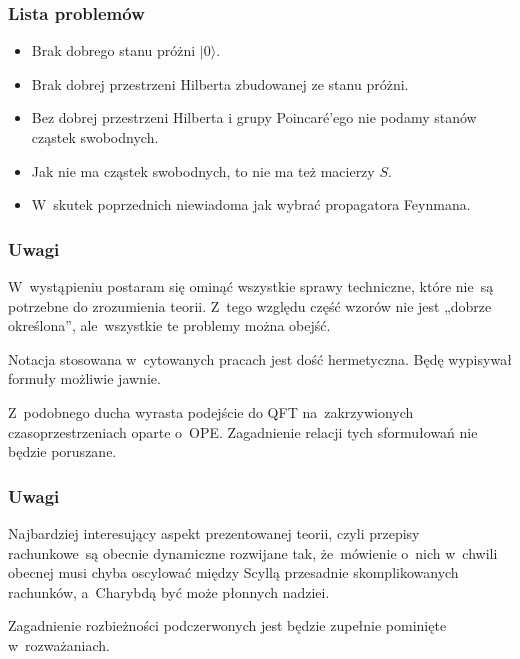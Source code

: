 \documentclass[10pt,t]{beamer}
\begin{document}
\begin{frame}
  \frametitle{Lista problemów}


  \begin{itemize}
    \RaggedRight

  \item Brak dobrego stanu próżni $| 0 \rangle$.

  \item Brak dobrej przestrzeni Hilberta zbudowanej ze stanu próżni.

  \item Bez dobrej przestrzeni Hilberta i grupy Poincar\'{e}’ego nie
    podamy stanów cząstek swobodnych.

  \item Jak nie ma cząstek swobodnych, to nie ma też macierzy $S$.

  \item W~skutek poprzednich niewiadoma jak wybrać propagatora
    Feynmana.

  \end{itemize}

\end{frame}





\begin{frame}
  \frametitle{Uwagi}


  W~wystąpieniu postaram się ominąć wszystkie sprawy techniczne,
  które nie~są potrzebne do zrozumienia teorii. Z~tego względu część
  wzorów nie jest „dobrze określona”, ale~wszystkie te problemy
  można obejść.

  Notacja stosowana w~cytowanych pracach jest dość hermetyczna. Będę
  wypisywał formuły możliwie jawnie.

  Z~podobnego ducha wyrasta podejście do QFT na~zakrzywionych
  czasoprzestrzeniach oparte o~OPE. Zagadnienie relacji
  tych sformułowań nie będzie poruszane.

\end{frame}





\begin{frame}
  \frametitle{Uwagi}


  Najbardziej interesujący aspekt prezentowanej teorii,
  czyli przepisy rachunkowe~są obecnie dynamiczne rozwijane tak,
  że~mówienie o~nich w~chwili obecnej musi chyba oscylować między
  Scyllą przesadnie skomplikowanych rachunków, a~Charybdą być może
  płonnych nadziei.

  Zagadnienie rozbieżności podczerwonych jest będzie zupełnie
  pominięte w~rozważaniach.

\end{frame}
\end{document}
